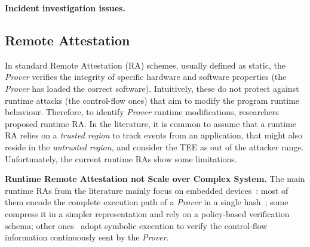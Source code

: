 \vspace{0.5cm}
\noindent \textbf{Incident investigation issues.}


\subsection{Remote Attestation}

In standard Remote Attestation (RA) schemes, usually defined as static, the 
\emph{Prover} verifies the integrity of specific hardware and 
software properties (\eg the \emph{Prover} has loaded the correct software).
Intuitively, these do not protect against runtime attacks (\eg the 
control-flow ones) that aim to modify the program runtime behaviour. 
Therefore, to identify \emph{Prover} runtime modifications, researchers 
proposed runtime RA.
In the literature, it is common to assume that a runtime RA relies on a 
\emph{trusted region} to track events from an application, that might also 
reside in the \emph{untrusted region}, and consider the TEE as out of the 
attacker range.
Unfortunately, the current runtime RAs show some limitations.

\vspace{0.5cm}
\noindent \textbf{Runtime Remote Attestation not Scale over Complex System.}
The main runtime RAs from the literature mainly focus on embedded 
devices~\citep{abera2016c,zeitouni2017atrium,aberadiat,dessouky2017fat,Dessouky:2018:LLH:3240765.3240821}:
most of them encode the complete execution path of a \emph{Prover} in a single 
hash~\citep{abera2016c,zeitouni2017atrium,dessouky2017fat}; 
some~\citep{aberadiat} compress it in a simpler representation and rely on a 
policy-based verification schema; 
other ones~\citep{Dessouky:2018:LLH:3240765.3240821} adopt symbolic execution 
to verify the control-flow information continuously sent by the \emph{Prover}.

